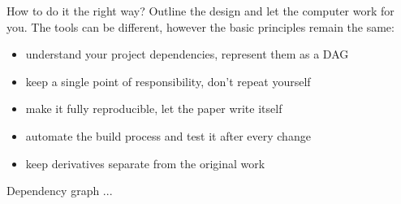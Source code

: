 \documentclass[
	9pt,
	hyperref = {unicode,pdfpagelabels=false},
	aspectratio = 43
	]{beamer}
\begin{document}
\begin{frame}{How to do it the right way?}
	Outline the design and let the computer work for you.
	The tools can be different, however the basic principles remain the same:
	\begin{itemize}
		\item understand your project dependencies, represent them as a DAG
		\item keep a single point of responsibility, don't repeat yourself
		\item make it fully reproducible, let the paper write itself
		\item automate the build process and test it after every change
		\item keep derivatives separate from the original work
	\end{itemize}
\end{frame}

\begin{frame}{Dependency graph}
	...
\end{frame}
\end{document}

